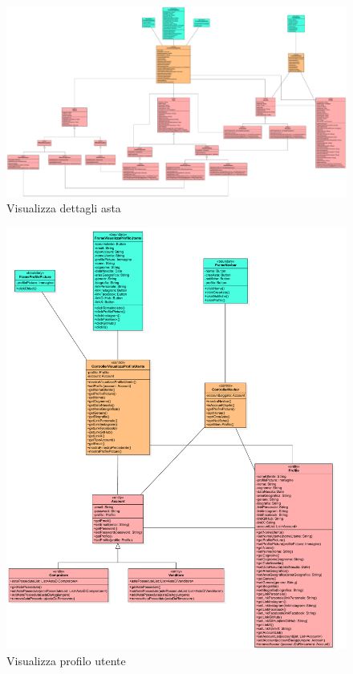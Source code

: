             \begin{figure}[htbp!]
                \centering
                    \includegraphics[width=1\linewidth]{Immagini/Diagrammi/Class Diagram/Utente generico/VisualizzaDettagliAsta.pdf}
                \caption{Visualizza dettagli asta}
            \end{figure}
            
            \begin{figure}[htbp!]
                \centering
                    \includegraphics[width=1\linewidth]{Immagini/Diagrammi/Class Diagram/Utente generico/VisualizzaProfiloUtente.pdf}
                \caption{Visualizza profilo utente}
            \end{figure}
            
